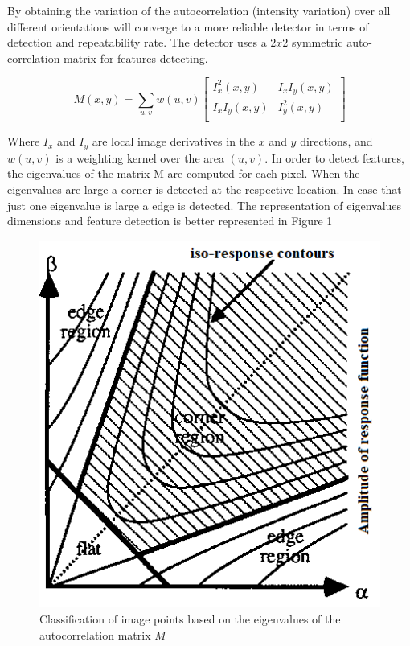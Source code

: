 \documentclass[9pt,shortpaper,twoside,web]{ieeecolor}
\begin{document}
By obtaining the variation of the autocorrelation (intensity variation) over all different orientations will converge to a more reliable detector in terms of detection and repeatability rate. The detector uses a $2 x 2$ symmetric auto-correlation matrix for features detecting.

\begin{equation}
\label{eq3}
M(x, y) = \sum\limits_{u, v} w(u, v) 
\begin{bmatrix}
I_x^2(x, y) & I_x I_y (x, y) \\
I_xI_y(x,y) & I_y^2(x, y) \\
\end{bmatrix}
\end{equation}

Where $I_x$ and $I_y$ are local image derivatives in the $x$ and $y$ directions, and $w(u, v)$ is a weighting kernel over the area $(u, v)$. In order to detect features, the eigenvalues of the matrix M are computed for each pixel. When the eigenvalues are large a corner is detected at the respective location. In case that just one eigenvalue is large a edge is detected. The representation of eigenvalues dimensions and feature detection is better represented in Figure 1

\begin{figure}[htb]
\includegraphics[width=0.9\columnwidth]{res/fig/Harris.png}
\caption{Classification of image points based on the eigenvalues of the autocorrelation matrix $M$ \cite{b3}}
\label{fig2}
\end{figure}
\end{document}

